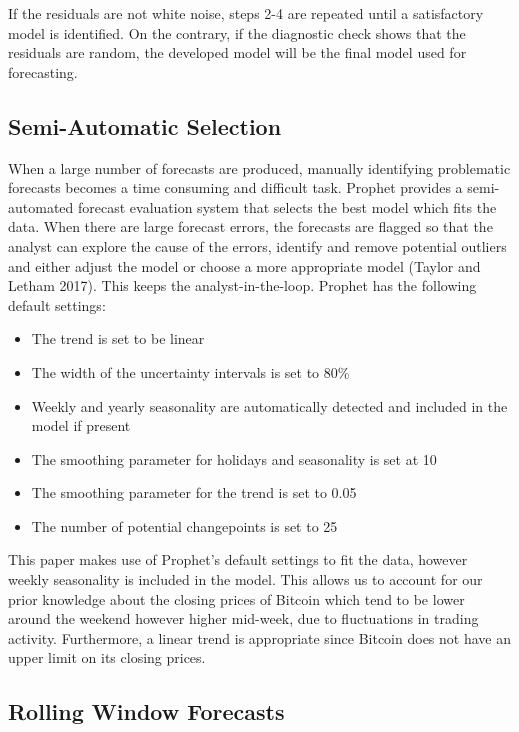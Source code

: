 \documentclass[12pt,a4paper]{article}
\numberwithin{equation}{section}
\numberwithin{figure}{section}
\numberwithin{table}{section}
\def\tightlist{}
\begin{document}
If the residuals are not white noise, steps 2-4 are repeated until a
satisfactory model is identified. On the contrary, if the diagnostic
check shows that the residuals are random, the developed model will be
the final model used for forecasting.

\subsection{\texorpdfstring{Semi-Automatic Selection
\label{Semi-Automatic Selection}}{Semi-Automatic Selection }}\label{semi-automatic-selection}

When a large number of forecasts are produced, manually identifying
problematic forecasts becomes a time consuming and difficult task.
Prophet provides a semi-automated forecast evaluation system that
selects the best model which fits the data. When there are large
forecast errors, the forecasts are flagged so that the analyst can
explore the cause of the errors, identify and remove potential outliers
and either adjust the model or choose a more appropriate model (Taylor
and Letham 2017). This keeps the analyst-in-the-loop. Prophet has the
following default settings:

\begin{itemize}
\tightlist
\item
  The trend is set to be linear
\item
  The width of the uncertainty intervals is set to 80\%
\item
  Weekly and yearly seasonality are automatically detected and included
  in the model if present
\item
  The smoothing parameter for holidays and seasonality is set at 10
\item
  The smoothing parameter for the trend is set to 0.05
\item
  The number of potential changepoints is set to 25
\end{itemize}

This paper makes use of Prophet's default settings to fit the data,
however weekly seasonality is included in the model. This allows us to
account for our prior knowledge about the closing prices of Bitcoin
which tend to be lower around the weekend however higher mid-week, due
to fluctuations in trading activity. Furthermore, a linear trend is
appropriate since Bitcoin does not have an upper limit on its closing
prices.

\subsection{Rolling Window Forecasts}\label{rolling-window-forecasts}
\end{document}
